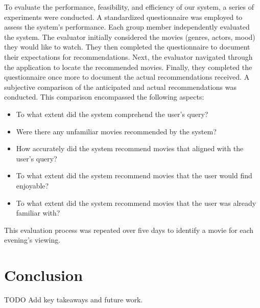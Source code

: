 \documentclass[12pt,a4paper]{article}
\begin{document}
  To evaluate the performance, feasibility, and efficiency of our system, a series of experiments were conducted.
  A standardized questionnaire was employed to assess the system’s performance. Each group member independently evaluated
  the system.
  The evaluator initially considered the movies (genres, actors, mood) they would like to watch. They then completed the
  questionnaire to document their expectations for recommendations.
  Next, the evaluator navigated through the application to locate the recommended movies. Finally, they completed the
  questionnaire once more to document the actual recommendations received.
  A subjective comparison of the anticipated and actual recommendations was conducted. This comparison encompassed the
  following aspects:
  \begin{itemize}
    \item To what extent did the system comprehend the user’s query?
    \item Were there any unfamiliar movies recommended by the system?
    \item How accurately did the system recommend movies that aligned with the user’s query?
    \item To what extent did the system recommend movies that the user would find enjoyable?
    \item To what extent did the system recommend movies that the user was already familiar with?
  \end{itemize}

  \noindent This evaluation process was repeated over five days to identify a movie for each evening’s viewing.

  \section{Conclusion}

  TODO Add key takeaways and future work.
\end{document}
